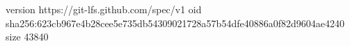 version https://git-lfs.github.com/spec/v1
oid sha256:623cb967e4b28cee5e735db54309021728a57b54dfe40886a0f82d9604ae4240
size 43840
